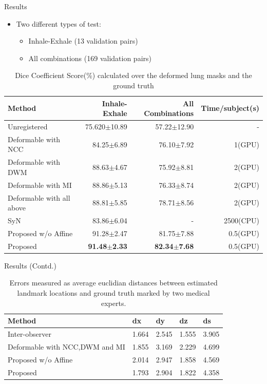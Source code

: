 \documentclass{beamer}
\begin{document}
\begin{frame}{Results}
    \begin{itemize}
        \item Two different types of test:
            \begin{itemize}
                \item Inhale-Exhale (13 validation pairs)
                \item All combinations (169 validation pairs)
            \end{itemize}
    \end{itemize}
    \begin{table}
    \centering
    \scriptsize
    \begin{tabular}{l r r r}
        \hline Method & Inhale-Exhale & All Combinations & Time/subject(s)\\\hline
         Unregistered & 75.620$\pm$10.89 & 57.22$\pm$12.90 & -\\
         Deformable with NCC & 84.25$\pm$6.89 & 76.10$\pm$7.92 & ~1(GPU)\\
         Deformable with DWM & 88.63$\pm$4.67 & 75.92$\pm$8.81 & ~2(GPU)\\
         Deformable with MI & 88.86$\pm$5.13 & 76.33$\pm$8.74 & ~2(GPU)\\
         Deformable with all above & 88.81$\pm$5.85 & 78.71$\pm$8.56 & ~2(GPU)\\
         SyN & 83.86$\pm$6.04 & - & ~2500(CPU)\\
         Proposed w/o Affine & 91.28$\pm$2.47 & 81.75$\pm$7.88 & ~0.5(GPU)\\
         Proposed & \textbf{91.48$\pm$2.33} & \textbf{82.34$\pm$7.68} & ~0.5(GPU)\\\hline
    \end{tabular}
    \caption{Dice Coefficient Score(\%) calculated over the deformed lung masks and the ground truth}
    \label{performance_table}
    \end{table}
\end{frame}

\begin{frame}{Results (Contd.)}
    \begin{table}
    \centering
    \small
    \begin{tabular}{l l l l l}
        \hline Method & dx & dy & dz & ds\\\hline
         Inter-observer & 1.664 & 2.545 & 1.555 & 3.905\\
         Deformable with NCC,DWM and MI  & 1.855 & 3.169 & 2.229 & 4.699\\
         Proposed w/o Affine  & 2.014 & 2.947 & 1.858 & 4.569\\
         Proposed  & 1.793 & 2.904 & 1.822 & 4.358\\\hline
    \end{tabular}
    \caption{Errors measured as average euclidian distances between estimated landmark locations and ground truth marked by two medical experts.}
    \label{comparision_table}
    \end{table}
\end{frame}
\end{document}
